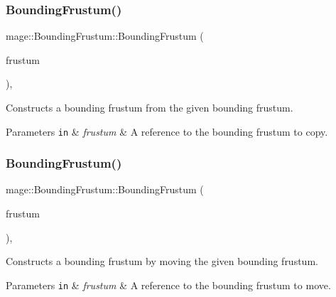 \subsubsection{\texorpdfstring{Bounding\+Frustum()}{BoundingFrustum()}\hspace{0.1cm}{\footnotesize\ttfamily [2/3]}}
{\footnotesize\ttfamily mage\+::\+Bounding\+Frustum\+::\+Bounding\+Frustum (\begin{DoxyParamCaption}\item[{const \hyperlink{classmage_1_1_bounding_frustum}{Bounding\+Frustum} \&}]{frustum }\end{DoxyParamCaption})\hspace{0.3cm}{\ttfamily [default]}, {\ttfamily [noexcept]}}

Constructs a bounding frustum from the given bounding frustum.


\begin{DoxyParams}[1]{Parameters}
\mbox{\tt in}  & {\em frustum} & A reference to the bounding frustum to copy. \\
\hline
\end{DoxyParams}
\hypertarget{classmage_1_1_bounding_frustum_a0eafed7a78a72d33a6153bdcffd07057}{}\label{classmage_1_1_bounding_frustum_a0eafed7a78a72d33a6153bdcffd07057} 
\subsubsection{\texorpdfstring{Bounding\+Frustum()}{BoundingFrustum()}\hspace{0.1cm}{\footnotesize\ttfamily [3/3]}}
{\footnotesize\ttfamily mage\+::\+Bounding\+Frustum\+::\+Bounding\+Frustum (\begin{DoxyParamCaption}\item[{\hyperlink{classmage_1_1_bounding_frustum}{Bounding\+Frustum} \&\&}]{frustum }\end{DoxyParamCaption})\hspace{0.3cm}{\ttfamily [default]}, {\ttfamily [noexcept]}}

Constructs a bounding frustum by moving the given bounding frustum.


\begin{DoxyParams}[1]{Parameters}
\mbox{\tt in}  & {\em frustum} & A reference to the bounding frustum to move. \\
\hline
\end{DoxyParams}
\hypertarget{classmage_1_1_bounding_frustum_a9837a92462da6a473f6ba5b7cc3b77fb}{}\label{classmage_1_1_bounding_frustum_a9837a92462da6a473f6ba5b7cc3b77fb} 
